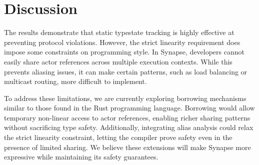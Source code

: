 \section{Discussion}
The results demonstrate that static typestate tracking is highly effective at preventing protocol violations. However, the strict linearity requirement does impose some constraints on programming style. In Synapse, developers cannot easily share actor references across multiple execution contexts. While this prevents aliasing issues, it can make certain patterns, such as load balancing or multicast routing, more difficult to implement.

To address these limitations, we are currently exploring borrowing mechanisms similar to those found in the Rust programming language. Borrowing would allow temporary non-linear access to actor references, enabling richer sharing patterns without sacrificing type safety. Additionally, integrating alias analysis could relax the strict linearity constraint, letting the compiler prove safety even in the presence of limited sharing. We believe these extensions will make Synapse more expressive while maintaining its safety guarantees.
